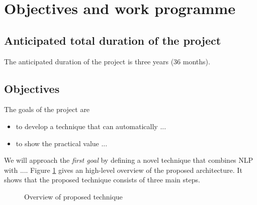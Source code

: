\documentclass{scrartcl}
\begin{document}
\section{Objectives and work programme}

\subsection{Anticipated total duration of the project}

The anticipated duration of the project is three years (36 months).

\subsection{Objectives}
\label{sec:objectives}

The goals of the project are 

\begin{itemize}
\item to develop a technique that can automatically ...   

\item to show the practical value ... 
\end{itemize}

We will approach the \textit{first goal} by defining a novel technique that combines NLP with .... Figure \ref{fig:approach} gives an high-level overview of the proposed architecture. It shows that the proposed technique consists of three main steps.   

\begin{figure}[h!]
\centering

\caption{Overview of proposed technique}
\label{fig:approach}
\end{figure}
\end{document}
